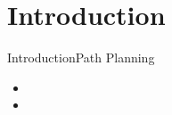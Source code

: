 \section{Introduction}

\begin{frame}{Introduction}{Path Planning}

\begin{itemize}
\item
\item 
\end{itemize}

\end{frame}

\begin{frame}{}{}
\end{frame}